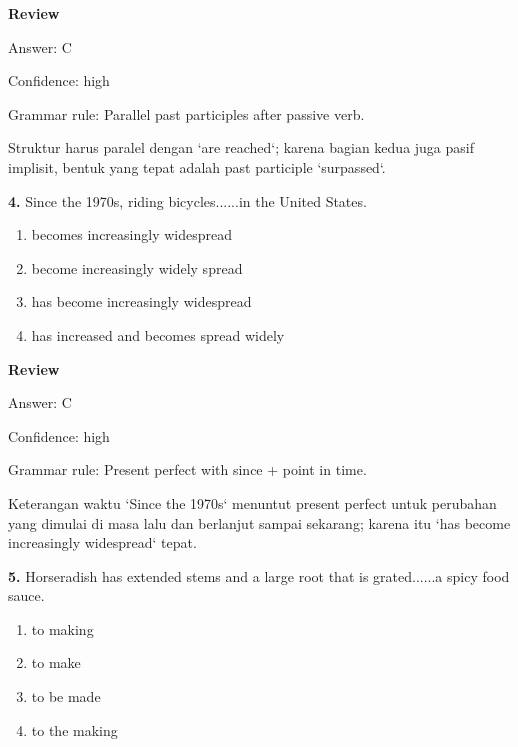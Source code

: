 \documentclass[12pt]{article}
\begin{document}
\par
\begingroup
\setlength{\parskip}{0pt}
\setlength{\parindent}{0pt}
\textbf{Review}\par
Answer: C\par
Confidence: high\par
Grammar rule: Parallel past participles after passive verb.\par
Struktur harus paralel dengan `are reached`; karena bagian kedua juga pasif implisit, bentuk yang tepat adalah past participle `surpassed`.\par
\endgroup
\par
\vspace{0.25\baselineskip}
\noindent\textbf{4.} Since the 1970s, riding bicycles......in the United States.
\begin{enumerate}[label=(\Alph*),leftmargin=*,itemsep=0.2em]
\item becomes increasingly widespread
\item become increasingly widely spread
\item has become increasingly widespread
\item has increased and becomes spread widely
\end{enumerate}
\par
\begingroup
\setlength{\parskip}{0pt}
\setlength{\parindent}{0pt}
\textbf{Review}\par
Answer: C\par
Confidence: high\par
Grammar rule: Present perfect with since + point in time.\par
Keterangan waktu `Since the 1970s` menuntut present perfect untuk perubahan yang dimulai di masa lalu dan berlanjut sampai sekarang; karena itu `has become increasingly widespread` tepat.\par
\endgroup
\par
\vspace{0.25\baselineskip}
\noindent\textbf{5.} Horseradish has extended stems and a large root that is grated......a spicy food sauce.
\begin{enumerate}[label=(\Alph*),leftmargin=*,itemsep=0.2em]
\item to making
\item to make
\item to be made
\item to the making
\end{enumerate}
\par
\begingroup
\setlength{\parskip}{0pt}
\setlength{\parindent}{0pt}
\end{document}
